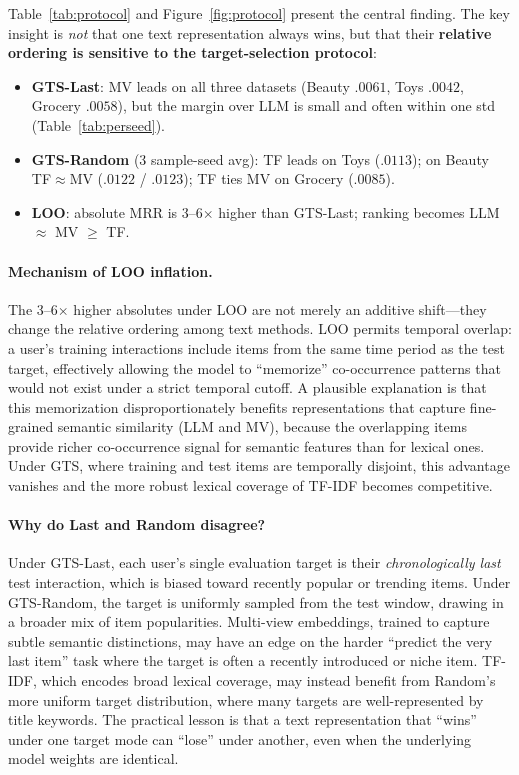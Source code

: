 \documentclass[sigconf,natbib=true,anonymous]{acmart}
\newcommand{\tfidf}{\textsc{TF-IDF}\xspace}
\begin{document}
Table~\ref{tab:protocol} and Figure~\ref{fig:protocol} present the central finding.
The key insight is \emph{not} that one text representation always wins, but that their \textbf{relative ordering is sensitive to the target-selection protocol}:

\begin{itemize}[leftmargin=*,itemsep=1pt]
\item \textbf{GTS-Last}: MV leads on all three datasets (Beauty $.0061$, Toys $.0042$, Grocery $.0058$), but the margin over LLM is small and often within one std (Table~\ref{tab:perseed}).
\item \textbf{GTS-Random} (3 sample-seed avg): TF leads on Toys ($.0113$); on Beauty TF$\approx$MV ($.0122$ / $.0123$); TF ties MV on Grocery ($.0085$).
\item \textbf{LOO}: absolute MRR is 3--6$\times$ higher than GTS-Last; ranking becomes LLM $\approx$ MV $\ge$ TF.
\end{itemize}

\paragraph{Mechanism of LOO inflation.}
The 3--6$\times$ higher absolutes under LOO are not merely an additive shift---they change the relative ordering among text methods.
LOO permits temporal overlap: a user's training interactions include items from the same time period as the test target, effectively allowing the model to ``memorize'' co-occurrence patterns that would not exist under a strict temporal cutoff.
A plausible explanation is that this memorization disproportionately benefits representations that capture fine-grained semantic similarity (LLM and MV), because the overlapping items provide richer co-occurrence signal for semantic features than for lexical ones.
Under GTS, where training and test items are temporally disjoint, this advantage vanishes and the more robust lexical coverage of \tfidf becomes competitive.

\paragraph{Why do Last and Random disagree?}
Under GTS-Last, each user's single evaluation target is their \emph{chronologically last} test interaction, which is biased toward recently popular or trending items.
Under GTS-Random, the target is uniformly sampled from the test window, drawing in a broader mix of item popularities.
Multi-view embeddings, trained to capture subtle semantic distinctions, may have an edge on the harder ``predict the very last item'' task where the target is often a recently introduced or niche item.
TF-IDF, which encodes broad lexical coverage, may instead benefit from Random's more uniform target distribution, where many targets are well-represented by title keywords.
The practical lesson is that a text representation that ``wins'' under one target mode can ``lose'' under another, even when the underlying model weights are identical.
\end{document}
